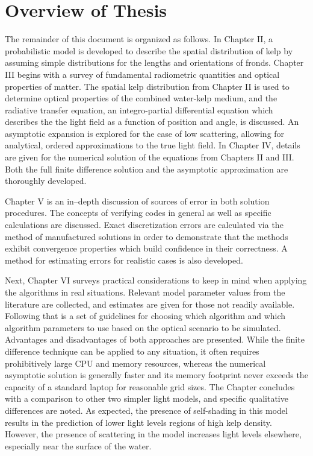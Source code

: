 \documentclass[ms,cpyr,lof,lot]{uathesis}
\begin{document}
\section{Overview of Thesis}
The remainder of this document is organized as follows.
In Chapter II, a probabilistic model is developed to describe the spatial distribution of kelp by assuming simple distributions for the lengths and orientations of fronds.
Chapter III begins with a survey of fundamental radiometric quantities and optical properties of matter.
The spatial kelp distribution from Chapter II is used to determine optical properties of the combined water-kelp medium,
and the radiative transfer equation, an integro-partial differential equation which describes the the light field as a function of position and angle, is discussed.
An asymptotic expansion is explored for the case of low scattering, allowing for analytical, ordered approximations to the true light field.
In Chapter IV, details are given for the numerical solution of the equations from Chapters II and III.
Both the full finite difference solution and the asymptotic approximation are thoroughly developed.

Chapter V is an in--depth discussion of sources of error in both solution procedures.
The concepts of verifying codes in general as well as specific calculations are discussed.
Exact discretization errors are calculated via the method of manufactured solutions in order to demonstrate
that the methods exhibit convergence properties which build confidence in their correctness.
A method for estimating errors for realistic cases is also developed.

Next, Chapter VI surveys practical considerations to keep in mind when applying the algorithms in real situations.
Relevant model parameter values from the literature are collected, and estimates are given for those not readily available.
Following that is a set of guidelines for choosing which algorithm and which algorithm parameters to use based on the optical scenario to be simulated.
Advantages and disadvantages of both approaches are presented.
While the finite difference technique can be applied to any situation, it often requires prohibitively large CPU and memory resources, whereas the numerical asymptotic solution is generally faster and its memory footprint never exceeds the capacity of a standard laptop for reasonable grid sizes.
The Chapter concludes with a comparison to other two simpler light models, and specific qualitative differences are noted.
As expected, the presence of self-shading in this model results in the prediction of lower light levels regions of high kelp density.
However, the presence of scattering in the model increases light levels elsewhere, especially near the surface of the water.
\end{document}
